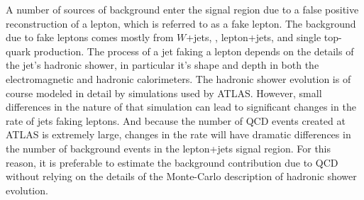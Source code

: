 

A number of sources of background enter the signal region due to a false positive reconstruction
of a lepton, which is referred to as a fake lepton.
The background due to fake leptons comes mostly from $W$+jets, \ttbar, lepton+jets, and single top-quark production.
The process of a jet faking a lepton depends on the details of the jet's hadronic shower, in particular it's shape and depth in both the electromagnetic and hadronic calorimeters.
The hadronic shower evolution is of course modeled in detail by simulations used by ATLAS.
However, small differences in the nature of that simulation can lead to significant changes in the rate of jets faking leptons.
And because the number of QCD events created at ATLAS is extremely large, changes in the rate will have dramatic differences in the number of background events in the lepton+jets signal region.
For this reason, it is preferable to estimate the background contribution due to QCD without relying on the details of the Monte-Carlo description of hadronic shower evolution.

